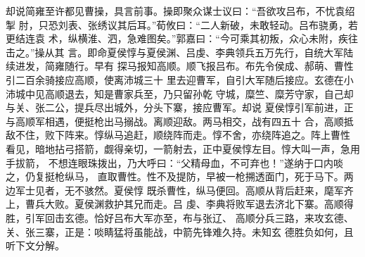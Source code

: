 却说简雍至许都见曹操，具言前事。操即聚众谋士议曰：“吾欲攻吕布，不忧袁绍掣
肘，只恐刘表、张绣议其后耳。”荀攸曰：“二人新破，未敢轻动。吕布骁勇，若更结连袁
术，纵横淮、泗，急难图矣。”郭嘉曰：“今可乘其初叛，众心未附，疾往击之。”操从其
言。即命夏侯惇与夏侯渊、吕虔、李典领兵五万先行，自统大军陆续进发，简雍随行。早有
探马报知高顺。顺飞报吕布。布先令侯成、郝萌、曹性引二百余骑接应高顺，使离沛城三十
里去迎曹军，自引大军随后接应。玄德在小沛城中见高顺退去，知是曹家兵至，乃只留孙乾
守城，糜竺、糜芳守家，自己却与关、张二公，提兵尽出城外，分头下寨，接应曹军。却说
夏侯惇引军前进，正与高顺军相遇，便挺枪出马搦战。离顺迎敌。两马相交，战有四五十
合，高顺抵敌不住，败下阵来。惇纵马追赶，顺绕阵而走。惇不舍，亦绕阵追之。阵上曹性
看见，暗地拈弓搭箭，觑得亲切，一箭射去，正中夏侯惇左目。惇大叫一声，急用手拔箭，
不想连眼珠拨出，乃大呼曰：“父精母血，不可弃也！”遂纳于口内啖之，仍复挺枪纵马，
直取曹性。性不及提防，早被一枪搠透面门，死于马下。两边军士见者，无不骇然。夏侯惇
既杀曹性，纵马便回。高顺从背后赶来，麾军齐上，曹兵大败。夏侯渊救护其兄而走。吕
虔、李典将败军退去济北下寨。高顺得胜，引军回击玄德。恰好吕布大军亦至，布与张辽、
高顺分兵三路，来攻玄德、关、张三寨，正是：啖睛猛将虽能战，中箭先锋难久持。未知玄
德胜负如何，且听下文分解。